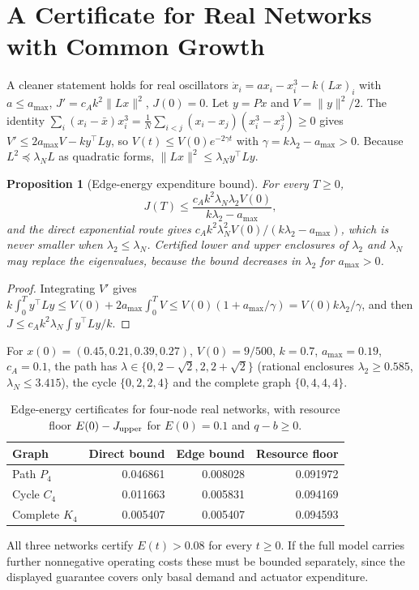 \documentclass[11pt,notitlepage]{report}
\newtheorem{proposition}[theorem]{Proposition}
\theoremstyle{definition}
\theoremstyle{remark}
\begin{document}
\section{A Certificate for Real Networks with Common Growth}
A cleaner statement holds for real oscillators $\dot x_i=ax_i-x_i^3-k(Lx)_i$ with $a\le a_{\max}$, $J'=c_Ak^2\|Lx\|^2$, $J(0)=0$. Let $y=Px$ and $V=\|y\|^2/2$. The identity $\sum_i(x_i-\bar x)x_i^3=\tfrac1N\sum_{i<j}(x_i-x_j)(x_i^3-x_j^3)\ge0$ gives $V'\le2a_{\max}V-ky^\top Ly$, so $V(t)\le V(0)e^{-2\gamma t}$ with $\gamma=k\lambda_2-a_{\max}>0$. Because $L^2\preceq\lambda_N L$ as quadratic forms, $\|Lx\|^2\le\lambda_Ny^\top Ly$.
\begin{proposition}[Edge-energy expenditure bound]\label{prop:realnet}
For every $T\ge0$,
\[
J(T)\le\frac{c_Ak^2\lambda_N\lambda_2V(0)}{k\lambda_2-a_{\max}},
\]
and the direct exponential route gives $c_Ak^2\lambda_N^2V(0)/(k\lambda_2-a_{\max})$, which is never smaller when $\lambda_2\le\lambda_N$. Certified lower and upper enclosures of $\lambda_2$ and $\lambda_N$ may replace the eigenvalues, because the bound decreases in $\lambda_2$ for $a_{\max}>0$.
\end{proposition}
\begin{proof}
Integrating $V'$ gives $k\int_0^Ty^\top Ly\le V(0)+2a_{\max}\int_0^TV\le V(0)(1+a_{\max}/\gamma)=V(0)k\lambda_2/\gamma$, and then $J\le c_Ak^2\lambda_N\int y^\top Ly/k$.
\end{proof}
For $x(0)=(0.45,0.21,0.39,0.27)$, $V(0)=9/500$, $k=0.7$, $a_{\max}=0.19$, $c_A=0.1$, the path has $\lambda\in\{0,2-\sqrt2,2,2+\sqrt2\}$ (rational enclosures $\lambda_2\ge0.585$, $\lambda_N\le3.415$), the cycle $\{0,2,2,4\}$ and the complete graph $\{0,4,4,4\}$.
\begin{table}[ht]\centering\small
\caption{Edge-energy certificates for four-node real networks, with resource floor $E(0)-J_{\rm upper}$ for $E(0)=0.1$ and $q-b\ge0$.}
\begin{tabular}{lrrr}\toprule
Graph&Direct bound&Edge bound&Resource floor\\\midrule
Path $P_4$&0.046861&0.008028&0.091972\\
Cycle $C_4$&0.011663&0.005831&0.094169\\
Complete $K_4$&0.005407&0.005407&0.094593\\\bottomrule
\end{tabular}
\end{table}
All three networks certify $E(t)>0.08$ for every $t\ge0$. If the full model carries further nonnegative operating costs these must be bounded separately, since the displayed guarantee covers only basal demand and actuator expenditure.
\end{document}
